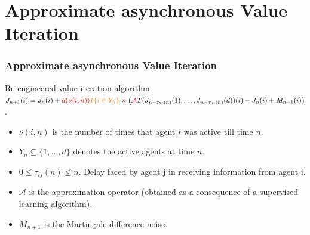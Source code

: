 \documentclass{beamer}
\begin{document}
\section{Approximate asynchronous Value Iteration}
\begin{frame}
 \frametitle{Approximate asynchronous Value Iteration}
 \begin{block}{Re-engineered value iteration algorithm} {\footnotesize
$J_{n+1}(i) = J_n(i) + {\color{red} a(\nu(i,n))} {\color{orange} I\{i \in Y_n\}} \times
\left( {\color{purple}\mathcal{A}}T (J_{n - \tau_{1i}(n)}(1), \ldots, 
J_{n - \tau_{di}(n)}(d))(i) - J_n(i) + M_{n+1}(i) \right)$.}
\end{block}
\begin{itemize}
\item $\nu(i,n)$ is the number of times that agent $i$ was active till time $n$.
 \item $Y_n \subseteq \{1, \ldots, d\}$ denotes the active agents at time $n$.
 \item $0 \le \tau_{ij}(n) \le n$. Delay faced by {\color{blue}agent j} in receiving information from 
 {\color{blue}agent i}.
 \item $\mathcal{A}$ is the approximation operator {\color{orange} 
 (obtained as a consequence of a supervised learning algorithm)}.
 \item $M_{n+1}$ is the Martingale difference noise.
\end{itemize}
\end{frame}
\end{document}
